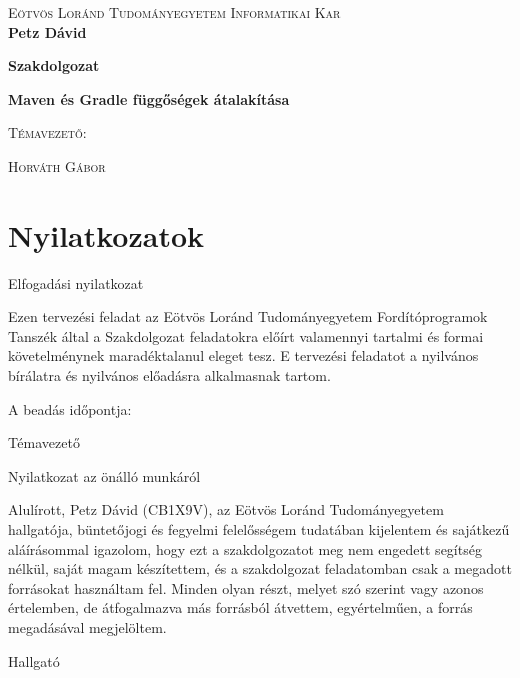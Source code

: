 \documentclass{article}
\begin{document}
	\begin{titlepage}
		\begin{center}
			\textsc{\Large  Eötvös Loránd Tudományegyetem}
			\textsc{\Large  Informatikai Kar} \\
			[6cm]
			\huge{\bfseries Petz Dávid}
			
			\huge{\bfseries Szakdolgozat}
			
			\huge{\bfseries Maven és Gradle függőségek átalakítása} \\
			[6cm]
			
			\begin{flushright}
				\textsc{\large Témavezető: }
				
				\textsc{\large Horváth Gábor}
			\end{flushright}			
		\end{center}
	\end{titlepage}
	\newpage
	\tableofcontents
	\newpage
	\section{Nyilatkozatok}\label{sec:statement}
	\begin{center}
		Elfogadási nyilatkozat
	\end{center}
	Ezen tervezési feladat az Eötvös Loránd Tudományegyetem Fordítóprogramok Tanszék által a Szakdolgozat feladatokra előírt valamennyi tartalmi és formai követelménynek maradéktalanul eleget tesz. E tervezési feladatot a nyilvános bírálatra és nyilvános előadásra alkalmasnak tartom.
	
	A beadás időpontja: \\
	[0.2cm]
	
	\begin{flushright}
		Témavezető
	\end{flushright}  
	\begin{center}
		Nyilatkozat az önálló munkáról
	\end{center}
	Alulírott, Petz Dávid (CB1X9V), az Eötvös Loránd Tudományegyetem hallgatója, büntetőjogi és fegyelmi felelősségem tudatában kijelentem és sajátkezű aláírásommal igazolom, hogy ezt a szakdolgozatot meg nem engedett segítség nélkül, saját magam készítettem, és a szakdolgozat feladatomban csak a megadott forrásokat használtam fel. Minden olyan részt, melyet szó szerint vagy azonos értelemben, de átfogalmazva más forrásból átvettem, egyértelműen, a forrás megadásával megjelöltem. \\
	[0.2cm]
	\begin{flushright}
		Hallgató
	\end{flushright}
\end{document}
